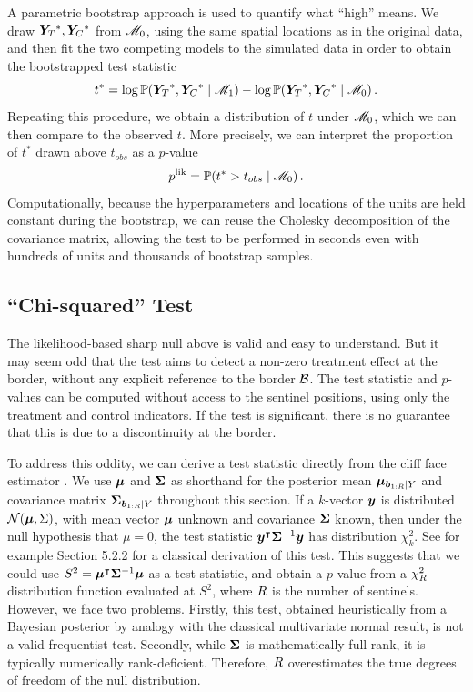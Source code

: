 	A parametric bootstrap approach is used to quantify what ``high'' means. We draw \(\bm{Y}_{T}{}^*,\bm{Y}_{C}{}^*\) from \(\mathscr{M}_0\),
using the same spatial locations as in the original data,
and then fit the two competing models to the simulated data in order to obtain the bootstrapped test statistic
\begin{equation}
    t^* = \log \Pr\del{\yt{}^*, \yc{}^* \mid \modalt} - \log \Pr\del{\yt{}^*, \yc{}^* \mid \modnull}\,.
\end{equation}
Repeating this procedure, we obtain a distribution of \(t\) under \(\mathscr{M}_0\),
which we can then compare to the observed \(t\).
More precisely, we can interpret the proportion of \(t^*\) drawn above \(t_{obs}\) as a \(p\)-value
\begin{equation}
    p^{\mathrm{lik}} = \Pr\del{t^* > t_{obs} \mid \modnull}\,.
\end{equation}
Computationally, because the hyperparameters and locations of the units are held constant during the bootstrap, we can reuse the Cholesky decomposition of the covariance matrix, allowing the test to be performed in seconds even with hundreds of units and thousands of bootstrap samples.

\subsection{``Chi-squared'' Test}
The likelihood-based sharp null above is valid and easy to understand.
But it may seem odd that the test aims to detect a non-zero treatment effect at the border, without any explicit reference to the border \(\mathcal{B}\).
The test statistic and \(p\)-values can be computed without access to the sentinel positions, using only the treatment and control indicators.
If the test is significant, there is no guarantee that this is due to a discontinuity at the border.

	To address this oddity, we can derive a test statistic directly from the cliff face estimator .
We use \(\bm{\mu}\) and \(\bm{\Sigma}\) as shorthand for the posterior mean \(\bm{\mu}_{\bm{b}_{1:R} \mid Y}\)
and covariance matrix \(\bm{\Sigma}_{\bm{b}_{1:R} \mid Y}\) throughout this section.
If a \(k\)-vector \(\bm{y}\) is distributed \(\normal\del{\muvec, \Sigma}\), with mean vector \(\bm{\mu}\) unknown and covariance \(\bm{\Sigma}\) known, then under the null hypothesis that \(\mu=0\), the test statistic \(\bm{y}^{\intercal} \bm{\Sigma}^{-1} \bm{y}\) has distribution \(\chi^2_k\).
See for example \cite{rencher2003methods} Section 5.2.2 for a classical derivation of this test.
This suggests that we could use \(S^2=\bm{\mu}^{\intercal} \bm{\Sigma}^{-1} \bm{\mu}\) as a test statistic,
and obtain a \(p\)-value from a \(\chi^2_R\) distribution function evaluated at \(S^2\), where \(R\) is the number of sentinels.
However, we face two problems.
Firstly, this test, obtained heuristically from a Bayesian posterior by analogy with the classical multivariate normal result, is not a valid frequentist test.
Secondly, while \(\bm{\Sigma}\) is mathematically full-rank, it is typically numerically rank-deficient.
Therefore, \(R\) overestimates the true degrees of freedom of the null distribution.

